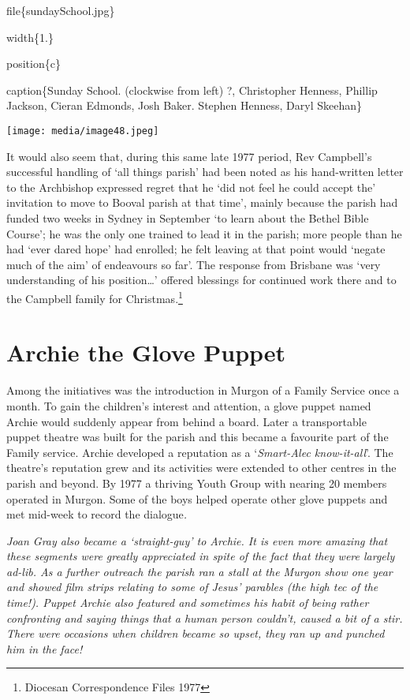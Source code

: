 file\{sundaySchool.jpg\}

width\{1.\}

position\{c\}

caption\{Sunday School. (clockwise from left) ?, Christopher Henness, Phillip Jackson, Cieran Edmonds, Josh Baker. Stephen Henness, Daryl Skeehan\}

\texttt{[image: media/image48.jpeg]}

It would also seem that, during this same late 1977 period, Rev Campbell's successful handling of `all things parish' had been noted as his hand-written letter to the Archbishop expressed regret that he `did not feel he could accept the' invitation to move to Booval parish at that time', mainly because the parish had funded two weeks in Sydney in September `to learn about the Bethel Bible Course'; he was the only one trained to lead it in the parish; more people than he had `ever dared hope' had enrolled; he felt leaving at that point would `negate much of the aim' of endeavours so far'. The response from Brisbane was `very understanding of his position\ldots' offered blessings for continued work there and to the Campbell family for Christmas.\footnote{Diocesan Correspondence Files 1977}

\hypertarget{archie-the-glove-puppet}{%
\section{Archie the Glove Puppet}\label{archie-the-glove-puppet}}

Among the initiatives was the introduction in Murgon of a Family Service once a month. To gain the children's interest and attention, a glove puppet named Archie would suddenly appear from behind a board. Later a transportable puppet theatre was built for the parish and this became a favourite part of the Family service. Archie developed a reputation as a `\emph{Smart-Alec know-it-all}'. The theatre's reputation grew and its activities were extended to other centres in the parish and beyond. By 1977 a thriving Youth Group with nearing 20 members operated in Murgon. Some of the boys helped operate other glove puppets and met mid-week to record the dialogue\emph{.}

\emph{Joan Gray also became a `straight-guy' to Archie. It is even more amazing that these segments were greatly appreciated in spite of the fact that they were largely ad-lib. As a further outreach the parish ran a stall at the Murgon show one year and showed film strips relating to some of Jesus' parables (the high tec of the time!). Puppet Archie also featured and sometimes his habit of being rather confronting and saying things that a human person couldn't, caused a bit of a stir. There were occasions when children became so upset, they ran up and punched him in the face!}

